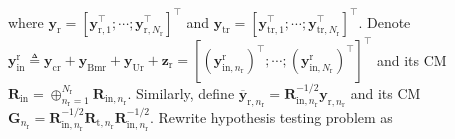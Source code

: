 \documentclass[9pt,journal]{IEEEtran}
\newcommand{\paren}[1]{\left({#1}\right)}
\newcommand{\bracket}[1]{{\left [{#1}\right ]}}
\newcommand{\rr}{_\mathrm{r}}
\newcommand{\sfrac}[2]{#1/#2}
\theoremstyle{definition}
\begin{document}

where $\mathbf{y}_{\mathrm{r}}=\bracket{\mathbf{y}^\top_{\textrm{r},1};\cdots;\mathbf{y}^\top_{\textrm{r},\mathit{N}\rr}}^\top$ and $\mathbf{y}_{\textrm{tr}}=\bracket{\mathbf{y}^\top_{\textrm{tr},1};\cdots;\mathbf{y}^\top_{\textrm{tr},\mathit{N}\rr}}^\top$. Denote $\mathbf{y}^\textrm{r}_{\textrm{in}}\triangleq\mathbf{y}_{\textrm{cr}}+\mathbf{y}_{\textrm{Bmr}}+\mathbf{y}_{\textrm{Ur}}+\mathbf{z}_{\textrm{r}}=\bracket{\paren{\mathbf{y}^{\textrm{r}}_{\textrm{in},n\rr}}^\top;\cdots;\paren{\mathbf{y}^{\textrm{r}}_{\textrm{in},\mathit{N}\rr}}^\top}^\top$ and its CM $\mathbf{R}_{\textrm{in}}=\oplus_{n\rr=1}^{N\rr}\mathbf{R}_{\textrm{in},n\rr}$. Similarly, define $\overline{\mathbf{y}}_{\textrm{r},n\rr} = \mathbf{R}^{-\sfrac{1}{2}}_{\textrm{in},n\rr}\mathbf{y}_{\textrm{r},n\rr}$ and its CM $\mathbf{G}_{n\rr}=\mathbf{R}^{-\sfrac{1}{2}}_{\textrm{in},n\rr}\mathbf{R}_{\textrm{t},n\rr}\mathbf{R}^{-\sfrac{1}{2}}_{\textrm{in},n\rr}$. Rewrite hypothesis testing problem as  \par\noindent\small
\end{document}
